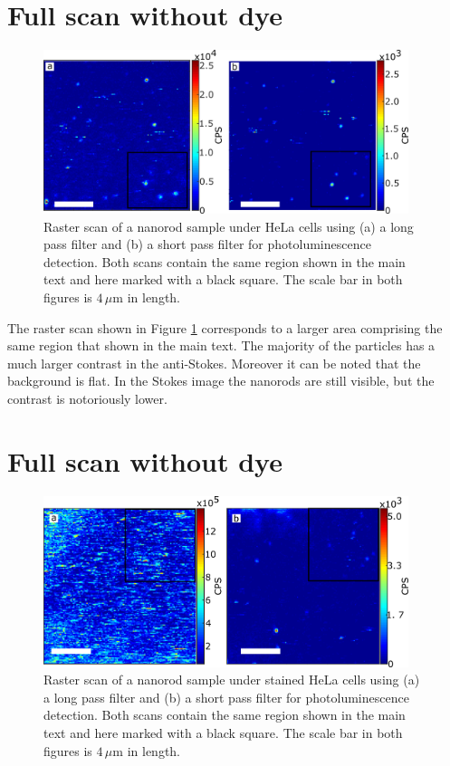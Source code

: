 \documentclass[journal=nalefd,manuscript=letter]{achemso}
\newcommand{\um}{\ensuremath{\,\mu\textrm{m}}}
\begin{document}
\section{Full scan without dye}
\begin{figure}[htp] \centering
\includegraphics[width=0.95\textwidth]{Figures/Supplementary/06_Full_scans/full_no_dye.png}
\caption{Raster scan of a nanorod sample under HeLa cells using (a) a long pass
filter and (b) a short pass filter for photoluminescence detection. Both scans
contain the same region shown in the main text and here marked with a black
square. The scale bar in both figures is $4\um$ in length.}
	\label{fig:full_no_dye}
\end{figure}

The raster scan shown in Figure \ref{fig:full_no_dye} corresponds to a larger
area comprising the same region that shown in the main text. The majority of the
particles has a much larger contrast in the anti-Stokes. Moreover it can be
noted that the background is flat. In the Stokes image the nanorods are still
visible, but the contrast is notoriously lower.

\section{Full scan without dye}
\begin{figure}[htp] \centering
\includegraphics[width=0.95\textwidth]{Figures/Supplementary/07_Full_scans_dye/full_with_dye.png}
\caption{Raster scan of a nanorod sample under stained HeLa cells using (a) a
long pass filter and (b) a short pass filter for photoluminescence detection. Both scans
contain the same region shown in the main text and here marked with a black
square. The scale bar in both figures is $4\um$ in length.}
	\label{fig:full_with_dye}
\end{figure}
\end{document}
